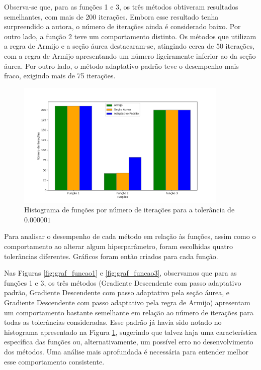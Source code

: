 \documentclass{article}
\begin{document}
Observa-se que, para as funções 1 e 3, os três métodos obtiveram resultados semelhantes, com mais de 200 iterações. Embora esse resultado tenha surpreendido a autora, o número de iterações ainda é considerado baixo. Por outro lado, a função 2 teve um comportamento distinto. Os métodos que utilizam a regra de Armijo e a seção áurea destacaram-se, atingindo cerca de 50 iterações, com a regra de Armijo apresentando um número ligeiramente inferior ao da seção áurea. Por outro lado, o método adaptativo padrão teve o desempenho mais fraco, exigindo mais de 75 iterações.


\begin{figure}[h]
  \centering
  \includegraphics[width=0.9\textwidth]{histogram.png}
  \caption{Histograma de funções por número de iterações para a tolerância de $0.000001$}
  \label{fig:hist_funcoes}
\end{figure}

Para analisar o desempenho de cada método em relação às funções, assim como o comportamento ao alterar algum hiperparâmetro, foram escolhidas quatro tolerâncias diferentes. Gráficos foram então criados para cada função.

Nas Figuras \ref{fig:graf_funcao1} e \ref{fig:graf_funcao3}, observamos que para as funções 1 e 3, os três métodos (Gradiente Descendente com passo adaptativo padrão, Gradiente Descendente com passo adaptativo pela seção áurea, e Gradiente Descendente com passo adaptativo pela regra de Armijo) apresentam um comportamento bastante semelhante em relação ao número de iterações para todas as tolerâncias consideradas. Esse padrão já havia sido notado no histograma apresentado na Figura \ref{fig:hist_funcoes}, sugerindo que talvez haja uma característica específica das funções ou, alternativamente, um possível erro no desenvolvimento dos métodos. Uma análise mais aprofundada é necessária para entender melhor esse comportamento consistente.
\end{document}
